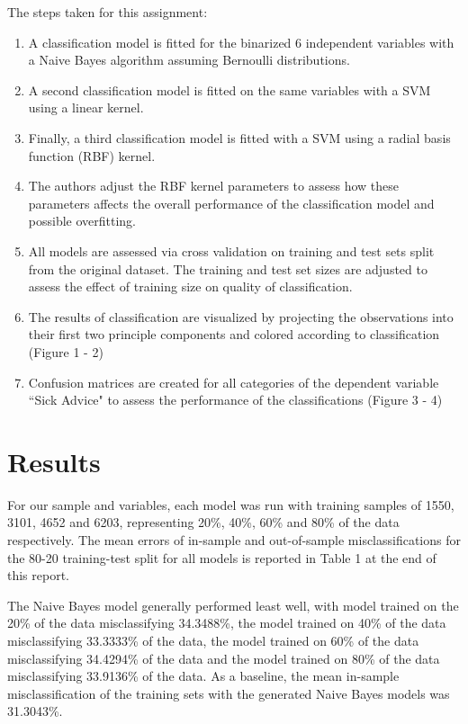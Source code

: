 \documentclass[10pt,twocolumn]{article}
\begin{document}
The steps taken for this assignment:

\begin{enumerate}
\item A classification model is fitted for the binarized 6 independent variables with
a Naive Bayes algorithm assuming Bernoulli distributions.
\item A second classification model is fitted on the same variables with
a SVM using a linear kernel.
\item Finally, a third classification model is fitted with a SVM using a radial basis
function (RBF) kernel.
\item The authors adjust the RBF kernel parameters to assess how these parameters
affects the overall performance of the classification model and possible overfitting.
\item All models are assessed via cross validation on training and test sets split
from the original dataset. The training and test set sizes are adjusted to assess the effect of training size on quality
of classification.
\item The results of classification are visualized by projecting the observations
into their first two principle components and colored according to classification (Figure 1 - 2)
\item Confusion matrices are created for all categories of the dependent variable
``Sick Advice" to assess the performance of the classifications (Figure 3 - 4)
\end{enumerate}

\section{Results}

For our sample and variables, each model was run with training samples of 1550,
3101, 4652 and 6203, representing 20\%, 40\%, 60\% and 80\% of the data respectively.
The mean errors of in-sample and out-of-sample misclassifications for the 80-20 training-test
split for all models is reported in Table 1 at the end of this report.

The Naive Bayes model generally performed least well, with model trained on the
20\% of the data misclassifying 34.3488\%, the model trained on 40\% of the data
misclassifying 33.3333\% of the data, the model trained on 60\% of the data
misclassifying 34.4294\% of the data and the model trained on 80\% of the data
misclassifying 33.9136\% of the data. As a baseline, the mean
in-sample misclassification of the training sets with the generated Naive Bayes models
 was 31.3043\%.
\end{document}
